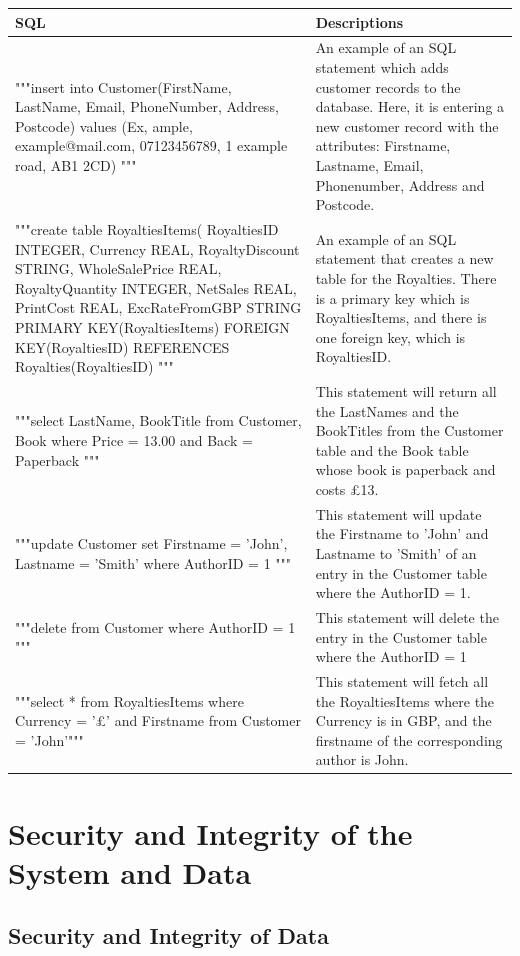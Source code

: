 \begin{tabular}{|p{6cm}|p{5cm}|}
    \hline
    \textbf{SQL} & \textbf{Descriptions} \\ \hline 
     """insert into Customer(FirstName, LastName, Email, PhoneNumber, Address, Postcode) values (Ex, ample, example@mail.com, 07123456789, 1 example road, AB1 2CD) """ & An example of an SQL statement which adds customer records to the database. Here, it is entering a new customer record with the attributes: Firstname, Lastname, Email, Phonenumber, Address and Postcode. \\ \hline
    """create table RoyaltiesItems( RoyaltiesID INTEGER,  Currency REAL,  RoyaltyDiscount STRING,  WholeSalePrice REAL, RoyaltyQuantity INTEGER, NetSales REAL, PrintCost REAL, ExcRateFromGBP STRING  PRIMARY KEY(RoyaltiesItems) FOREIGN KEY(RoyaltiesID) REFERENCES  Royalties(RoyaltiesID) """ & An example of an SQL statement that creates a new table for the Royalties. There is a primary key which is RoyaltiesItems, and there is one foreign key, which is RoyaltiesID. \\ \hline 
    """select LastName, BookTitle from Customer, Book where Price = 13.00 and  Back = Paperback """ & This statement will return all the LastNames and the BookTitles from the Customer table and the Book table whose book is paperback and costs £13. \\ \hline
    """update Customer set Firstname = 'John', Lastname = 'Smith' where AuthorID = 1 """ & This statement will update the Firstname to 'John' and Lastname to 'Smith' of an entry in the Customer table where the AuthorID = 1. \\ \hline
    """delete from Customer where AuthorID = 1 """ & This statement will delete the entry in the Customer table where the AuthorID = 1 \\ \hline
    """select * from RoyaltiesItems where Currency = '£' and Firstname from Customer = 'John'""" & This statement will fetch all the RoyaltiesItems where the Currency is in GBP, and the firstname of the corresponding author is John. \\ \hline
\end{tabular}

\section{Security and Integrity of the System and Data}

\subsection{Security and Integrity of Data}

